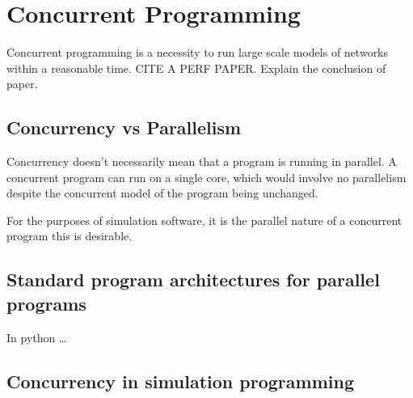 \section{Concurrent Programming}

Concurrent programming is a necessity to run large scale models of networks
within a reasonable time. CITE A PERF PAPER. Explain the conclusion of paper.

\subsection{Concurrency vs Parallelism}

Concurrency doesn't necessarily mean that a program is running in parallel. A
concurrent program can run on a single core, which would involve no parallelism
despite the concurrent model of the program being unchanged.

For the purposes of simulation software, it is the parallel nature of a
concurrent program this is desirable. 

\subsection{Standard program architectures for parallel programs}

In python \ldots

\subsection{Concurrency in simulation programming}


